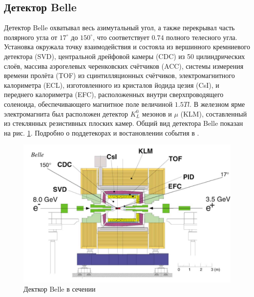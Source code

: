 \subsection{Детектор Belle}

Детектор Belle охватывал весь азимутальный угол, а также перекрывал 
часть полярного угла от $17^{\circ} $ до $150^{\circ} $, что соответствует $0.74$
полного телесного угла. Установка окружала точку взаимодействия и состояла 
из вершинного кремниевого детектора (SVD), центральной дрейфовой 
камеры (CDC) из 50 цилиндрических слоёв, массива аэрогелевых черенковских 
счётчиков (ACC), системы измерения времени пролёта (TOF) из сцинтилляционных 
счётчиков, электромагнитного калориметра (ECL), изготовленного из кристалов 
йодида цезия (CsI), и переднего калориметра (EFC), расположенных внутри 
сверхпроводящего соленоида, обеспечивающего магнитное поле величиной 
$1.5 Tl$. В железном ярме электромагнита был расположен детектор $K_L^0$ мезонов 
и $\mu$ (KLM), составленный из стеклянных резистивных плоских камер. 
Общий вид детектора Belle показан на рис. \ref{the:belle}. Подробно о поддетекорах 
и востановлении события в .

\begin{figure}[H]
    \centering
    \includegraphics[width=0.8\linewidth]{img/the_belle.png}
    \caption{Декткор Belle в сечении}
    \label{the:belle}
\end{figure}




